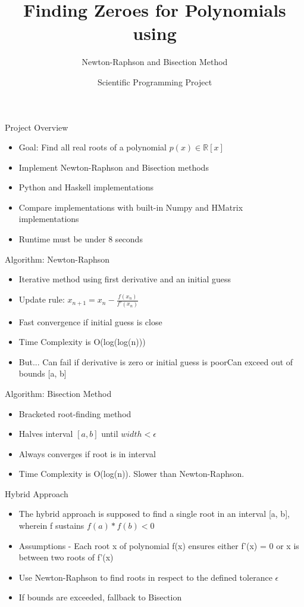 \documentclass{beamer}
\title{Finding Zeroes for Polynomials using}
\subtitle{Newton-Raphson and Bisection Method}
\author{Scientific Programming Project}
\begin{document}
\frame{\titlepage}

\begin{frame}{Project Overview}
\begin{itemize}
    \item Goal: Find all real roots of a polynomial \( p(x) \in \mathbb{R}[x] \)
    \item Implement Newton-Raphson and Bisection methods
    \item Python and Haskell implementations
    \item Compare implementations with built-in Numpy and HMatrix implementations
    \item Runtime must be under 8 seconds
\end{itemize}
\end{frame}

\begin{frame}{Algorithm: Newton-Raphson}
\begin{itemize}
    \item Iterative method using first derivative and an initial guess
    \item Update rule: \( x_{n+1} = x_n - \frac{f(x_n)}{f'(x_n)} \)
    \item Fast convergence if initial guess is close
    \item Time Complexity is O(log(log(n)))
    \item But... Can fail if derivative is zero or initial guess is poor\newline Can exceed out of bounds [a, b]
\end{itemize}
\end{frame}

\begin{frame}{Algorithm: Bisection Method}
\begin{itemize}
    \item Bracketed root-finding method
    \item Halves interval \([a, b]\) until $width < \epsilon\ $ \
    \item Always converges if root is in interval
    \item Time Complexity is O(log(n)). Slower than Newton-Raphson.
\end{itemize}
\end{frame}

\begin{frame}{Hybrid Approach}
\begin{itemize}
    \item The hybrid approach is supposed to find a single root in an interval [a, b], wherein f sustains $f(a)*f(b) < 0 $
    \item Assumptions - Each root x of polynomial f(x) ensures either f'(x) = 0 or x is between two roots of f'(x)
    \item Use Newton-Raphson to find roots in respect to the defined tolerance $\epsilon\ $ \
    \item If bounds are exceeded, fallback to Bisection
\end{itemize}
\end{frame}
\end{document}
